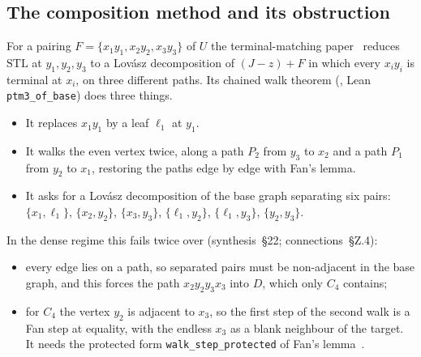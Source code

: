 \documentclass[11pt]{amsart}
\theoremstyle{definition}
\newcommand{\STL}{\mathrm{STL}}
\begin{document}
\subsection*{The composition method and its obstruction}
For a pairing $F=\{x_1y_1,x_2y_2,x_3y_3\}$ of $U$ the terminal-matching paper~\cite{TM}
reduces $\STL$ at $y_1,y_2,y_3$ to a Lov\'asz decomposition of $(J-z)+F$ in which every
$x_iy_i$ is terminal at $x_i$, on three different paths. Its chained walk theorem
(\cite[Thm~8.2]{TM}, Lean \texttt{ptm3\_of\_base}) does three things.
\begin{itemize}
\item It replaces $x_1y_1$ by a leaf $\ell_1$ at $y_1$.
\item It walks the even vertex twice, along a path $P_2$ from $y_3$ to $x_2$ and a path $P_1$
from $y_2$ to $x_1$, restoring the paths edge by edge with Fan's lemma.
\item It asks for a Lov\'asz decomposition of the base graph separating six pairs:
$\{x_1,\ell_1\}$, $\{x_2,y_2\}$, $\{x_3,y_3\}$, $\{\ell_1,y_2\}$, $\{\ell_1,y_3\}$,
$\{y_2,y_3\}$.
\end{itemize}
In the dense regime this fails twice over (synthesis~\S22; connections~\S Z.4):
\begin{itemize}
\item every edge lies on a path, so separated pairs must be non-adjacent in the base graph, and
this forces the path $x_2y_2y_3x_3$ into $D$, which only $C_4$ contains;
\item for $C_4$ the vertex $y_2$ is adjacent to $x_3$, so the first step of the second walk is a
Fan step at equality, with the endless $x_3$ as a blank neighbour of the target. It needs the
protected form \texttt{walk\_step\_protected} of Fan's lemma~\cite{TF}.
\end{itemize}
\end{document}
